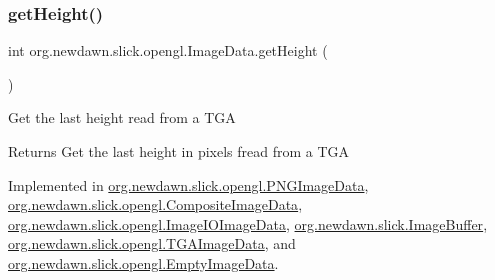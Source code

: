 \mbox{\label{interfaceorg_1_1newdawn_1_1slick_1_1opengl_1_1_image_data_acce23925ae561e75f051d3287a8dda06}} 
\subsubsection{\texorpdfstring{get\+Height()}{getHeight()}}
{\footnotesize\ttfamily int org.\+newdawn.\+slick.\+opengl.\+Image\+Data.\+get\+Height (\begin{DoxyParamCaption}{ }\end{DoxyParamCaption})}

Get the last height read from a T\+GA

\begin{DoxyReturn}{Returns}
Get the last height in pixels fread from a T\+GA 
\end{DoxyReturn}


Implemented in \mbox{\hyperlink{classorg_1_1newdawn_1_1slick_1_1opengl_1_1_p_n_g_image_data_a9d1cd9b5b83fed3b02f07413e026ecc9}{org.\+newdawn.\+slick.\+opengl.\+P\+N\+G\+Image\+Data}}, \mbox{\hyperlink{classorg_1_1newdawn_1_1slick_1_1opengl_1_1_composite_image_data_a4dbc5f72fe7bfb16716c631c8b12c5fb}{org.\+newdawn.\+slick.\+opengl.\+Composite\+Image\+Data}}, \mbox{\hyperlink{classorg_1_1newdawn_1_1slick_1_1opengl_1_1_image_i_o_image_data_a9c15548c1f9ec6b5d591f44198c5722f}{org.\+newdawn.\+slick.\+opengl.\+Image\+I\+O\+Image\+Data}}, \mbox{\hyperlink{classorg_1_1newdawn_1_1slick_1_1_image_buffer_a658cb27b181a326ee4de313b08190411}{org.\+newdawn.\+slick.\+Image\+Buffer}}, \mbox{\hyperlink{classorg_1_1newdawn_1_1slick_1_1opengl_1_1_t_g_a_image_data_a8c2eee4a09c160a0f4fbe6f49db7b888}{org.\+newdawn.\+slick.\+opengl.\+T\+G\+A\+Image\+Data}}, and \mbox{\hyperlink{classorg_1_1newdawn_1_1slick_1_1opengl_1_1_empty_image_data_a438df2e9d7d8b326713750b55d110b36}{org.\+newdawn.\+slick.\+opengl.\+Empty\+Image\+Data}}.

\mbox{\label{interfaceorg_1_1newdawn_1_1slick_1_1opengl_1_1_image_data_a7b15d49f552cad075bb1179668ce5250}} 
